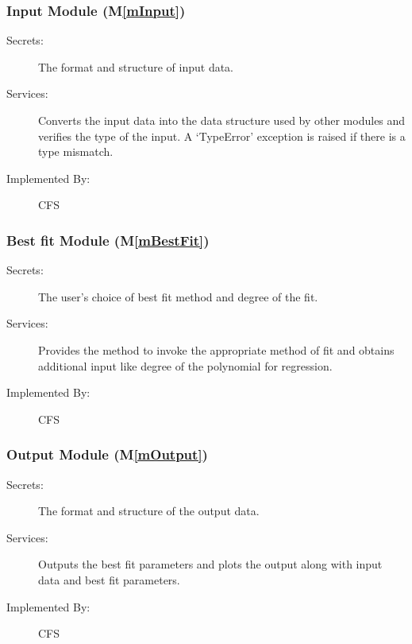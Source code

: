 \documentclass[12pt, titlepage]{article}
\newcommand{\mref}[1]{M\ref{#1}}
\newcommand{\famname}{CFS} %
\begin{document}
\subsubsection{Input Module (\mref{mInput})}

\begin{description}
	\item[Secrets:]The format and structure of input data.
	\item[Services:]Converts the input data into the data structure used by other modules and verifies the type of the input. A `TypeError' exception is raised if there is a type mismatch. 
	\item[Implemented By:] \famname{}
\end{description}

\subsubsection{Best fit Module (\mref{mBestFit})}

\begin{description}
	\item[Secrets:]The user's choice of best fit method and degree of the fit.
	\item[Services:] Provides the method to invoke the appropriate method of fit and obtains additional input like degree of the polynomial for regression.
	\item[Implemented By:] \famname{}
\end{description}


\subsubsection{Output Module (\mref{mOutput})}

\begin{description}
	\item[Secrets:] The format and structure of the output data.
	\item[Services:] Outputs the best fit parameters and plots the output along with input data and best fit parameters.
	\item[Implemented By:] \famname{}
\end{description} 

\end{document}
